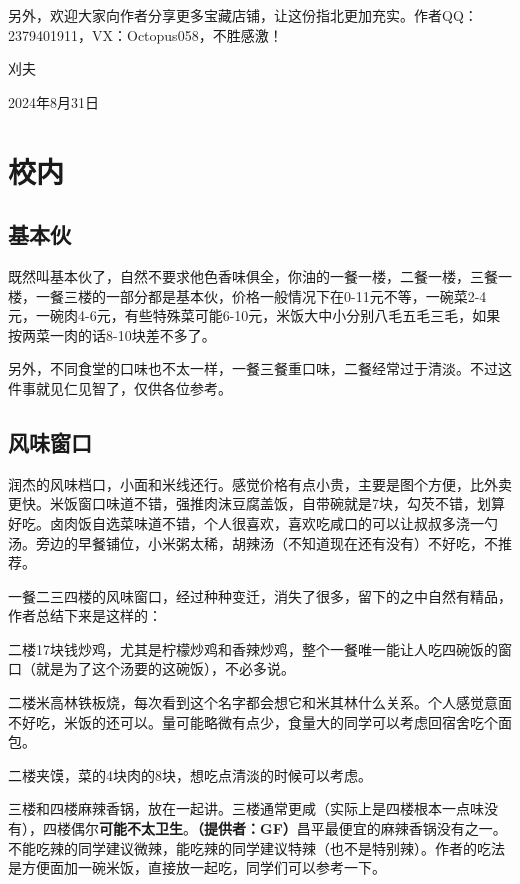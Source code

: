\documentclass[lang=cn,color=blue,12pt,scheme=chinese,chinesefont=nofont]{elegantbook}
\newcommand{\xw}[1]{{\CJKfamily{xw}#1}}
\begin{document}
另外，欢迎大家向作者分享更多宝藏店铺，让这份指北更加充实。作者QQ：2379401911，VX：Octopus058，不胜感激！
\vspace{16.8pt}
\begin{flushright}
    \xw{刈夫}

    2024年8月31日
\end{flushright}

\mainmatter

\chapter{校内}

\section{基本伙}
既然叫基本伙了，自然不要求他色香味俱全，你油的一餐一楼，二餐一楼，三餐一楼，一餐三楼的一部分都是基本伙，价格一般情况下在0-11元不等，一碗菜2-4元，一碗肉4-6元，有些特殊菜可能6-10元，米饭大中小分别八毛五毛三毛，如果按两菜一肉的话8-10块差不多了。

另外，不同食堂的口味也不太一样，一餐三餐重口味，二餐经常过于清淡。不过这件事就见仁见智了，仅供各位参考。

\section{风味窗口}
润杰的风味档口，小面和米线还行。感觉价格有点小贵，主要是图个方便，比外卖更快。米饭窗口味道不错，强推肉沫豆腐盖饭，自带碗就是7块，勾芡不错，划算好吃。卤肉饭自选菜味道不错，个人很喜欢，喜欢吃咸口的可以让叔叔多浇一勺汤。旁边的早餐铺位，小米粥太稀，胡辣汤（不知道现在还有没有）不好吃，不推荐。

一餐二三四楼的风味窗口，经过种种变迁，消失了很多，留下的之中自然有精品，作者总结下来是这样的：

二楼17块钱炒鸡，尤其是柠檬炒鸡和香辣炒鸡，整个一餐唯一能让人吃四碗饭的窗口（就是为了这个汤要的这碗饭），不必多说。

二楼米高林铁板烧，每次看到这个名字都会想它和米其林什么关系。个人感觉意面不好吃，米饭的还可以。量可能略微有点少，食量大的同学可以考虑回宿舍吃个面包。

二楼夹馍，菜的4块肉的8块，想吃点清淡的时候可以考虑。

三楼和四楼麻辣香锅，放在一起讲。三楼通常更咸（实际上是四楼根本一点味没有），四楼偶尔\textbf{可能不太卫生}。\textbf{（提供者：GF）}昌平最便宜的麻辣香锅没有之一。不能吃辣的同学建议微辣，能吃辣的同学建议特辣（也不是特别辣）。作者的吃法是方便面加一碗米饭，直接放一起吃，同学们可以参考一下。
\end{document}
